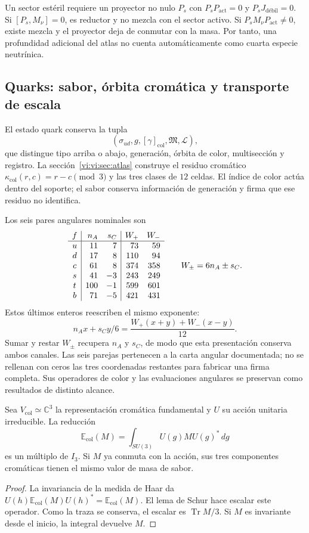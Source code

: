 Un sector estéril requiere un proyector no nulo \(P_s\) con
\(P_sP_{\mathrm{act}}=0\) y \(P_sJ_{\text{débil}}=0\).
Si \([P_s,M_\nu]=0\), es reductor y no mezcla con el sector activo.
Si \(P_sM_\nu P_{\mathrm{act}}\ne0\), existe mezcla y el proyector
deja de conmutar con la masa. Por tanto, una profundidad adicional del
atlas no cuenta automáticamente como cuarta especie neutrínica.

\subsection{Quarks: sabor, órbita cromática y transporte de escala}
\label{vi:vi:subsec:quarks-familias}

El estado quark conserva la tupla
\[
 (\sigma_{ud},g,[\gamma]_{\mathrm{col}},\mathfrak M,\mathscr L),
\]
que distingue tipo arriba o abajo, generación, órbita de color,
multisección y registro. La sección~\ref{vi:vi:sec:atlas} construye el
residuo cromático \(\kappa_{\mathrm{col}}(r,c)=r-c\pmod3\) y las
tres clases de \(12\) celdas. El índice de color actúa dentro del
soporte; el sabor conserva información de generación y firma que ese
residuo no identifica.

Los seis pares angulares nominales son
\[
\begin{array}{c|r r|r r}
 f&n_A&s_C&W_+&W_-\\\hline
 u&11&7&73&59\\
 d&17&8&110&94\\
 c&61&8&374&358\\
 s&41&-3&243&249\\
 t&100&-1&599&601\\
 b&71&-5&421&431
\end{array}
\qquad W_\pm=6n_A\pm s_C.
\]
Estos últimos enteros reescriben el mismo exponente:
\[
 n_Ax+s_Cy/6
 =\frac{W_+(x+y)+W_-(x-y)}{12}.
\]
Sumar y restar \(W_\pm\) recupera \(n_A\) y \(s_C\), de modo que
esta presentación conserva ambos canales. Las seis parejas pertenecen
a la carta angular documentada; no se rellenan con ceros las tres
coordenadas restantes para fabricar una firma completa. Sus operadores
de color y las evaluaciones angulares se preservan como resultados de
distinto alcance.

\begin{proposition}
\label{vi:vi:prop:masa-color}
Sea \(V_{\mathrm{col}}\simeq\mathbb C^3\) la representación cromática
fundamental y \(U\) su acción unitaria irreducible. La reducción
\[
 \mathbb E_{\mathrm{col}}(M)=
 \int_{SU(3)}U(g)MU(g)^*\,dg
\]
es un múltiplo de \(I_3\). Si \(M\) ya conmuta con la acción, sus tres
componentes cromáticas tienen el mismo valor de masa de sabor.
\end{proposition}
\begin{proof}
La invariancia de la medida de Haar da
\(U(h)\mathbb E_{\mathrm{col}}(M)U(h)^*=
\mathbb E_{\mathrm{col}}(M)\). El lema de Schur hace escalar este
operador. Como la traza se conserva, el escalar es
\(\operatorname{Tr}M/3\). Si \(M\) es invariante desde el inicio,
la integral devuelve \(M\).
\end{proof}


